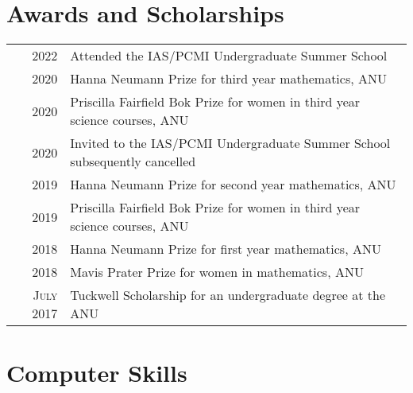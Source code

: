 \documentclass[a4paper,12pt]{article} %
\begin{document}

\section{Awards and Scholarships}

\begin{tabular}{rl}
2022 & Attended the IAS/PCMI Undergraduate Summer School\\

2020 & Hanna Neumann Prize \footnotesize for third year mathematics, ANU \normalsize\\

2020 & Priscilla Fairfield Bok Prize \footnotesize for women in third year science courses, ANU \normalsize\\

2020 & Invited to the IAS/PCMI Undergraduate Summer School \footnotesize subsequently cancelled\\

2019 & Hanna Neumann Prize \footnotesize for second year mathematics, ANU \normalsize\\

2019 & Priscilla Fairfield Bok Prize \footnotesize for women in third year science courses, ANU \normalsize\\

2018 & Hanna Neumann Prize \footnotesize for first year mathematics, ANU \normalsize\\

2018 & Mavis Prater Prize \footnotesize for women in mathematics, ANU \normalsize\\

\textsc{July} 2017 & Tuckwell Scholarship \footnotesize for an undergraduate degree at the ANU\\

\end{tabular}


\section{Computer Skills}
\end{document}
